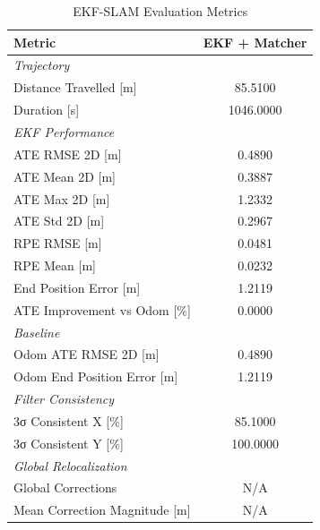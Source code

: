 \begin{table}[htbp]
\centering
\caption{EKF-SLAM Evaluation Metrics}
\label{tab:ekf_results}
\begin{tabular}{lc}
\toprule
Metric & \textbf{EKF + Matcher} \\
\midrule
\multicolumn{2}{l}{\textit{Trajectory}} \\
Distance Travelled [m] & 85.5100 \\
Duration [s] & 1046.0000 \\
\midrule
\multicolumn{2}{l}{\textit{EKF Performance}} \\
ATE RMSE 2D [m] & 0.4890 \\
ATE Mean 2D [m] & 0.3887 \\
ATE Max 2D [m] & 1.2332 \\
ATE Std 2D [m] & 0.2967 \\
RPE RMSE [m] & 0.0481 \\
RPE Mean [m] & 0.0232 \\
End Position Error [m] & 1.2119 \\
ATE Improvement vs Odom [\%] & 0.0000 \\
\midrule
\multicolumn{2}{l}{\textit{Baseline}} \\
Odom ATE RMSE 2D [m] & 0.4890 \\
Odom End Position Error [m] & 1.2119 \\
\midrule
\multicolumn{2}{l}{\textit{Filter Consistency}} \\
3σ Consistent X [\%] & 85.1000 \\
3σ Consistent Y [\%] & 100.0000 \\
\midrule
\multicolumn{2}{l}{\textit{Global Relocalization}} \\
Global Corrections & N/A \\
Mean Correction Magnitude [m] & N/A \\
\midrule
\bottomrule
\end{tabular}
\end{table}